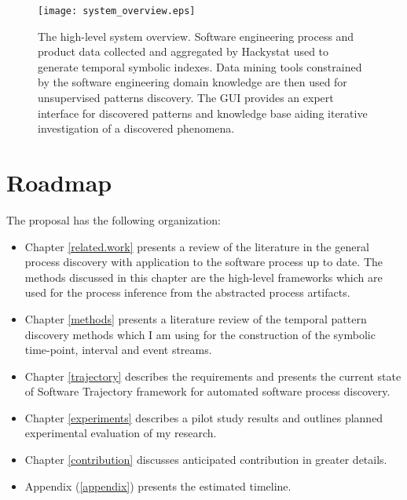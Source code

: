 \begin{figure}[tbp]
   \centering
   \texttt{[image: system\_overview.eps]}
   \caption{The high-level system overview. Software engineering process and product data collected and aggregated by Hackystat used to generate temporal symbolic indexes. Data mining tools constrained by the software engineering domain knowledge are then used for unsupervised patterns discovery. The GUI provides an expert interface for discovered patterns and knowledge base aiding iterative investigation of a discovered phenomena.}
   \label{fig:system_overview}
\end{figure}

\section{Roadmap}
The proposal has the following organization:
\begin{itemize}
	\item Chapter \ref{related.work} presents a review of the literature in the general process discovery with application to the software process up to date. The methods discussed in this chapter are the high-level frameworks which are used for the process inference from the abstracted process artifacts.
	\item Chapter \ref{methods} presents a literature review of the temporal pattern discovery methods which I am using for the construction of the symbolic time-point, interval and event streams.
	\item Chapter \ref{trajectory} describes the requirements and presents the current state of Software Trajectory framework for automated software process discovery.
	\item Chapter \ref{experiments} describes a pilot study results and outlines planned experimental evaluation of my research.
	\item Chapter \ref{contribution} discusses anticipated contribution in greater details.
	\item Appendix (\ref{appendix}) presents the estimated timeline.
\end{itemize}
